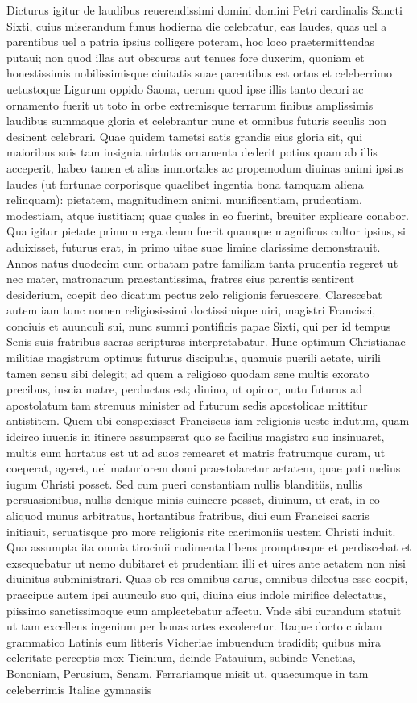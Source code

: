 \documentclass[a5paper,twoside]{article}
\begin{document}
Dicturus igitur de laudibus reuerendissimi domini domini Petri cardinalis Sancti Sixti, cuius miserandum funus hodierna die celebratur, eas laudes, quas uel a parentibus uel a patria ipsius colligere poteram, hoc loco praetermittendas putaui; non quod illas aut obscuras aut tenues fore duxerim, quoniam et honestissimis nobilissimisque ciuitatis suae parentibus est ortus et celeberrimo uetustoque Ligurum oppido Saona, uerum quod ipse illis tanto decori ac ornamento fuerit ut toto in orbe extremisque terrarum finibus amplissimis laudibus summaque gloria et celebrantur nunc et omnibus futuris seculis non desinent celebrari. Quae quidem tametsi satis grandis eius gloria sit, qui maioribus suis tam insignia uirtutis ornamenta dederit potius quam ab illis acceperit, habeo tamen et alias immortales ac propemodum diuinas animi ipsius laudes (ut fortunae corporisque quaelibet ingentia bona tamquam aliena relinquam): pietatem, magnitudinem animi, munificentiam, prudentiam, modestiam, atque iustitiam; quae quales in eo fuerint, breuiter explicare conabor. Qua igitur pietate primum erga deum fuerit quamque magnificus cultor ipsius, si aduixisset, futurus erat, in primo uitae suae limine clarissime demonstrauit. Annos natus duodecim cum orbatam patre familiam tanta prudentia regeret ut nec mater, matronarum praestantissima, fratres eius parentis sentirent desiderium, coepit deo dicatum pectus zelo religionis feruescere. Clarescebat autem iam tunc nomen religiosissimi doctissimique uiri, magistri Francisci, conciuis et auunculi sui, nunc summi pontificis papae Sixti, qui per id tempus Senis suis fratribus sacras scripturas interpretabatur. Hunc optimum Christianae militiae magistrum optimus futurus discipulus, quamuis puerili aetate, uirili tamen sensu sibi delegit; ad quem a religioso quodam sene multis exorato precibus, inscia matre, perductus est; diuino, ut opinor, nutu futurus ad apostolatum tam strenuus minister ad futurum sedis apostolicae mittitur antistitem. Quem ubi conspexisset Franciscus iam religionis ueste indutum, quam idcirco iuuenis in itinere assumpserat quo se facilius magistro suo insinuaret, multis eum hortatus est ut ad suos remearet et matris fratrumque curam, ut coeperat, ageret, uel maturiorem domi praestolaretur aetatem, quae pati melius iugum Christi posset. Sed cum pueri constantiam nullis blanditiis, nullis persuasionibus, nullis denique minis euincere posset, diuinum, ut erat, in eo aliquod munus arbitratus, hortantibus fratribus, diui eum Francisci sacris initiauit, seruatisque pro more religionis rite caerimoniis uestem Christi induit. Qua assumpta ita omnia tirocinii rudimenta libens promptusque et perdiscebat et exsequebatur ut nemo dubitaret et prudentiam illi et uires ante aetatem non nisi diuinitus subministrari. Quas ob res omnibus carus, omnibus dilectus esse coepit, praecipue autem ipsi auunculo suo qui, diuina eius indole mirifice delectatus, piissimo sanctissimoque eum amplectebatur affectu. Vnde sibi curandum statuit ut tam excellens ingenium per bonas artes excoleretur. Itaque docto cuidam grammatico Latinis eum litteris Vicheriae imbuendum tradidit; quibus mira celeritate perceptis mox Ticinium, deinde Patauium, subinde Venetias, Bononiam, Perusium, Senam, Ferrariamque misit ut, quaecumque in tam celeberrimis Italiae gymnasiis 
\end{document}
